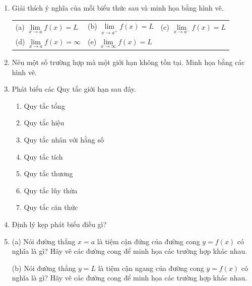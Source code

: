 \begin{minipage}[t]{0.485\textwidth}
\begin{enumerate}[label=\textbf{\arabic*.}, leftmargin=1.5em, start=1, itemsep=6pt, topsep=0pt]
    \item Giải thích ý nghĩa của mỗi biểu thức sau và minh họa bằng hình vẽ.
    \par\vspace{2pt}
    \begingroup
    \setlength{\tabcolsep}{1.5pt}
    \begin{tabular}{@{}lll@{}}
        (a) $\lim\limits_{x\to a} f(x) = L$ & (b) $\lim\limits_{x\to a^+} f(x) = L$ & (c) $\lim\limits_{x\to a^-} f(x) = L$ \\[5pt]
        (d) $\lim\limits_{x\to a} f(x) = \infty$ & (e) $\lim\limits_{x\to \infty} f(x) = L$ &
    \end{tabular}
    \endgroup

    \item Nêu một số trường hợp mà một giới hạn không tồn tại. Minh họa bằng các hình vẽ.

    \item Phát biểu các Quy tắc giới hạn sau đây.
    \begin{enumerate}[label=(\alph*), leftmargin=1.6em, itemsep=1.5pt, topsep=2pt]
        \item Quy tắc tổng
        \item Quy tắc hiệu
        \item Quy tắc nhân với hằng số
        \item Quy tắc tích
        \item Quy tắc thương
        \item Quy tắc lũy thừa
        \item Quy tắc căn thức
    \end{enumerate}

    \item Định lý kẹp phát biểu điều gì?

    \item (a) Nói đường thẳng $x = a$ là tiệm cận đứng của đường cong $y = f(x)$ có nghĩa là gì? Hãy vẽ các đường cong để minh họa các trường hợp khác nhau.
    \par\vspace{2pt}
    (b) Nói đường thẳng $y = L$ là tiệm cận ngang của đường cong $y = f(x)$ có nghĩa là gì? Hãy vẽ các đường cong để minh họa các trường hợp khác nhau.
\end{enumerate}
\end{minipage}%
\hfill
